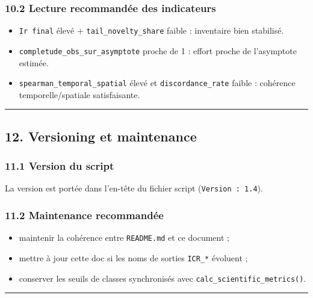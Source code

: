 \subsubsection{10.2 Lecture recommandée des
indicateurs}\label{lecture-recommanduxe9e-des-indicateurs}

\begin{itemize}
\tightlist
\item
  \texttt{Ir\ final} élevé + \texttt{tail\_novelty\_share} faible :
  inventaire bien stabilisé.
\item
  \texttt{completude\_obs\_sur\_asymptote} proche de 1 : effort proche
  de l'asymptote estimée.
\item
  \texttt{spearman\_temporal\_spatial} élevé et
  \texttt{discordance\_rate} faible : cohérence temporelle/spatiale
  satisfaisante.
\end{itemize}

\begin{center}\rule{0.5\linewidth}{0.5pt}\end{center}

\subsection{12. Versioning et
maintenance}\label{versioning-et-maintenance}

\subsubsection{11.1 Version du script}\label{version-du-script}

La version est portée dans l'en-tête du fichier script
(\texttt{Version\ :\ 1.4}).

\subsubsection{11.2 Maintenance
recommandée}\label{maintenance-recommanduxe9e}

\begin{itemize}
\tightlist
\item
  maintenir la cohérence entre \texttt{README.md} et ce document ;
\item
  mettre à jour cette doc si les noms de sorties \texttt{ICR\_*}
  évoluent ;
\item
  conserver les seuils de classes synchronisés avec
  \texttt{calc\_scientific\_metrics()}.
\end{itemize}

\begin{center}\rule{0.5\linewidth}{0.5pt}\end{center}

